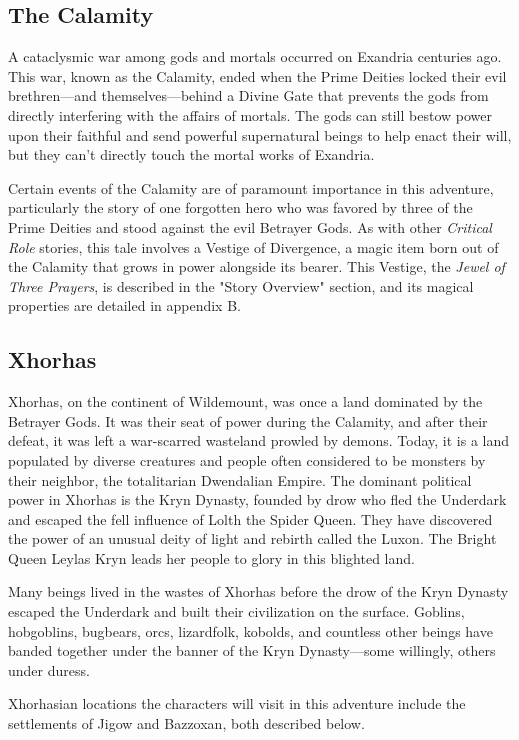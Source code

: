 \documentclass[10pt,a4paper,twoside,bg=print,twocolumn,openany,nodeprecatedcode]{dndbook}
\begin{document}
\subsection{The Calamity}
A cataclysmic war among gods and mortals occurred on Exandria centuries ago. This war, known as the Calamity, ended when the Prime Deities locked their evil brethren—and themselves—behind a Divine Gate that prevents the gods from directly interfering with the affairs of mortals. The gods can still bestow power upon their faithful and send powerful supernatural beings to help enact their will, but they can't directly touch the mortal works of Exandria.

Certain events of the Calamity are of paramount importance in this adventure, particularly the story of one forgotten hero who was favored by three of the Prime Deities and stood against the evil Betrayer Gods. As with other \textit{Critical Role} stories, this tale involves a Vestige of Divergence, a magic item born out of the Calamity that grows in power alongside its bearer. This Vestige, the \textit{Jewel of Three Prayers}, is described in the "Story Overview" section, and its magical properties are detailed in appendix B.

\subsection{Xhorhas}
Xhorhas, on the continent of Wildemount, was once a land dominated by the Betrayer Gods. It was their seat of power during the Calamity, and after their defeat, it was left a war-scarred wasteland prowled by demons. Today, it is a land populated by diverse creatures and people often considered to be monsters by their neighbor, the totalitarian Dwendalian Empire. The dominant political power in Xhorhas is the Kryn Dynasty, founded by drow who fled the Underdark and escaped the fell influence of Lolth the Spider Queen. They have discovered the power of an unusual deity of light and rebirth called the Luxon. The Bright Queen Leylas Kryn leads her people to glory in this blighted land.

Many beings lived in the wastes of Xhorhas before the drow of the Kryn Dynasty escaped the Underdark and built their civilization on the surface. Goblins, hobgoblins, bugbears, orcs, lizardfolk, kobolds, and countless other beings have banded together under the banner of the Kryn Dynasty—some willingly, others under duress.

Xhorhasian locations the characters will visit in this adventure include the settlements of Jigow and Bazzoxan, both described below.
\end{document}
